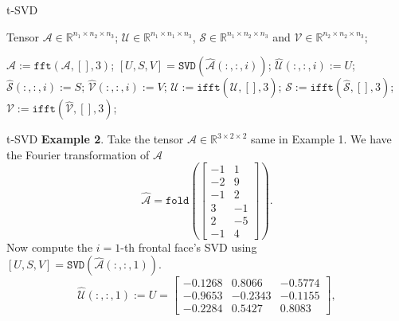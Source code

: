 \documentclass{beamer}
\begin{document}

\begin{frame}{t-SVD}
\begin{algorithm}[H] 
\caption{t-SVD} 
\label{alg1} 
\begin{algorithmic}[1] 
\Require 
Tensor $\mathcal{A} \in \mathbb{R}^{n_1 \times n_2 \times n_3}$; 
\Ensure 
$\mathcal{U} \in \mathbb{R}^{n_1 \times n_1 \times n_3}$, $\mathcal{S} \in \mathbb{R}^{n_1 \times n_2 \times n_3}$ and $\mathcal{V} \in \mathbb{R}^{n_2 \times n_2 \times n_3}$;

\State $\hat{\mathcal{A}} := \texttt{fft}(\mathcal{A},[],3)$;
\State $[U,S,V]=\texttt{SVD}(\hat{\mathcal{A}}(:,:,i))$; 
\State $\hat{\mathcal{U}}(:,:,i):=U$;
\State $\hat{\mathcal{S}}(:,:,i):=S$;
\State $\hat{\mathcal{V}}(:,:,i):=V$;
\EndFor
\State $\mathcal{U}:=\texttt{ifft}(\hat{\mathcal{U}},[],3)$;
\State $\mathcal{S}:=\texttt{ifft}(\hat{\mathcal{S}},[],3)$;
\State $\mathcal{V}:=\texttt{ifft}(\hat{\mathcal{V}},[],3)$;
\end{algorithmic} 
\end{algorithm}

\end{frame}

\begin{frame}{t-SVD}
\textbf{Example 2}. Take the tensor $\mathcal{A} \in \mathbb{R}^{3\times 2 \times 2}$ same in Example 1. We have the Fourier transformation of $\mathcal{A}$
$$
\hat{\mathcal{A}} = 
\texttt{fold}\left(
\left[\begin{array}{cc}
-1 & 1\\
-2 & 9\\
-1 & 2\\
\hline
3 & -1\\
2 & -5\\
-1 & 4
\end{array}\right]\right).
$$
Now compute the $i=1$-th frontal face's SVD using $[U,S,V]=\texttt{SVD}(\hat{\mathcal{A}}(:,:,1))$.
$$
\hat{\mathcal{U}}(:,:,1):=U=\left[\begin{array}{ccc}
   -0.1268  &  0.8066 & -0.5774\\
   -0.9653  & -0.2343  & -0.1155\\
   -0.2284  &  0.5427  &  0.8083
\end{array}\right],
$$
\end{frame}
\end{document}
